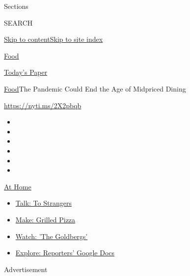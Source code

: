 Sections

SEARCH

\protect\hyperlink{site-content}{Skip to
content}\protect\hyperlink{site-index}{Skip to site index}

\href{https://www.nytimes.com/section/food}{Food}

\href{https://myaccount.nytimes.com/auth/login?response_type=cookie\&client_id=vi}{}

\href{https://www.nytimes.com/section/todayspaper}{Today's Paper}

\href{/section/food}{Food}\textbar{}The Pandemic Could End the Age of
Midpriced Dining

\url{https://nyti.ms/2X2pbqb}

\begin{itemize}
\item
\item
\item
\item
\item
\item
\end{itemize}

\href{https://www.nytimes.com/spotlight/at-home?action=click\&pgtype=Article\&state=default\&region=TOP_BANNER\&context=at_home_menu}{At
Home}

\begin{itemize}
\tightlist
\item
  \href{https://www.nytimes.com/2020/08/03/well/family/the-benefits-of-talking-to-strangers.html?action=click\&pgtype=Article\&state=default\&region=TOP_BANNER\&context=at_home_menu}{Talk:
  To Strangers}
\item
  \href{https://www.nytimes.com/2020/08/01/at-home/coronavirus-make-pizza-on-a-grill.html?action=click\&pgtype=Article\&state=default\&region=TOP_BANNER\&context=at_home_menu}{Make:
  Grilled Pizza}
\item
  \href{https://www.nytimes.com/2020/07/31/arts/television/goldbergs-abc-stream.html?action=click\&pgtype=Article\&state=default\&region=TOP_BANNER\&context=at_home_menu}{Watch:
  'The Goldbergs'}
\item
  \href{https://www.nytimes.com/interactive/2020/at-home/even-more-reporters-editors-diaries-lists-recommendations.html?action=click\&pgtype=Article\&state=default\&region=TOP_BANNER\&context=at_home_menu}{Explore:
  Reporters' Google Docs}
\end{itemize}

Advertisement

